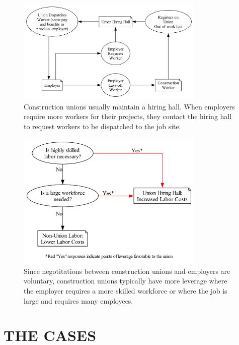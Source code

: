 \begin{figure}
  \centering
  \includegraphics[width=0.8\textwidth]{images/hiring_hall}
  \captionsetup{justification=centering, singlelinecheck=false, margin=2cm} 
  \caption{Construction unions usually maintain a hiring hall. When employers require more workers for their projects, they contact the hiring hall to request workers to be dispatched to the job site.}
  \label{fig:hiring_hall}
\end{figure}

\begin{figure}
  \centering
  \includegraphics[width=0.8\textwidth]{images/union_power_red}
  \captionsetup{justification=centering, singlelinecheck=false, margin=2cm} 
  \caption{Since negotitations between construction unions and employers are voluntary, construction unions typically have more leverage where the employer requires a more skilled workforce or where the job is large and requires many employees.}
  \label{fig:union_power_red}
\end{figure}

\section{THE CASES} \

